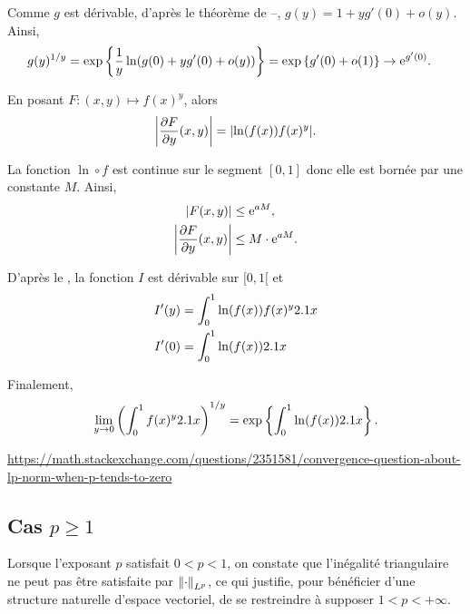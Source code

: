 \begin{solution}
\begin{reponses}
\item Comme $g$ est dérivable, d'après le théorème de --, $g(y) = 1 + y g'(0) + o(y)$. Ainsi,
\begin{align*}
g(y)^{1/y} &= \exp\left\{\frac{1}{y} \ln(g(0) + y g'(0) + o(y))\right\}
= \exp\left\{g'(0) + o(1)\right\}
\to \mathrm{e}^{g'(0)}.
\end{align*}

\item En posant $F: (x, y) \mapsto f(x)^y$, alors
\[
\abs{\frac{\partial F}{\partial y}(x, y)} = \abs{\ln(f(x)) f(x)^y}.
\]

La fonction $\ln \circ f$ est continue sur le segment $[0, 1]$ donc elle est bornée par une constante $M$. Ainsi,
\begin{align*}
\left| F(x, y) \right| &\leq \mathrm{e}^{a M},\\
\left| \frac{\partial F}{\partial y}(x, y) \right| &\leq M \cdot \mathrm{e}^{a M}.
\end{align*}

D'après le , la fonction $I$ est dérivable sur $[0, 1[$ et
\begin{align*}
I'(y) &= \int_0^1 \ln(f(x)) f(x)^y 2.1 x \\
I'(0) &= \int_0^1 \ln(f(x)) 2.1 x
\end{align*}

\item Finalement,
\[
\lim_{y\to0} \left(\int_0^1 f(x)^y 2.1 x\right)^{1/y} = \exp\left\{\int_0^1 \ln(f(x)) 2.1 x\right\}.
\]
\end{reponses}
\end{solution}

\url{https://math.stackexchange.com/questions/2351581/convergence-question-about-lp-norm-when-p-tends-to-zero}


\subsection{Cas $p \geq 1$}

Lorsque l'exposant $p$ satisfait $0 < p < 1$, on constate que l'inégalité triangulaire ne peut pas être satisfaite par $\norm{\cdot}_{L^p}$, ce qui justifie, pour bénéficier d’une structure naturelle d’espace vectoriel, de se restreindre à supposer $1 < p < +\infty$.

